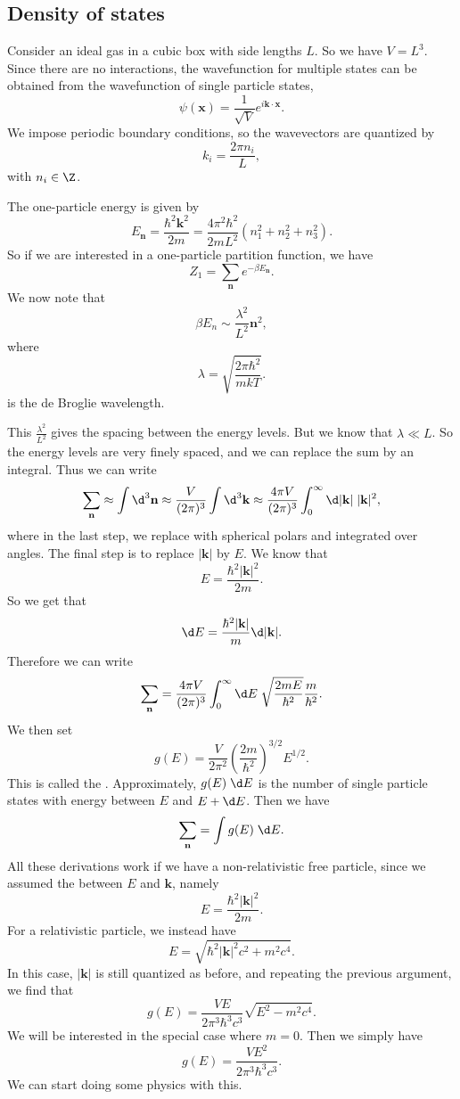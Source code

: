 \documentclass[a4paper]{article}
\begin{document}
\subsection{Density of states}
Consider an ideal gas in a cubic box with side lengths $L$. So we have $V = L^3$. Since there are no interactions, the wavefunction for multiple states can be obtained from the wavefunction of single particle states,
\[
  \psi(\mathbf{x}) = \frac{1}{\sqrt{V}} e^{i\mathbf{k}\cdot \mathbf{x}}.
\]
We impose periodic boundary conditions, so the wavevectors are quantized by
\[
  k_i = \frac{2\pi n_i}{L},
\]
with $n_i \in \Z$.

The one-particle energy is given by
\[
  E_\mathbf{n} = \frac{\hbar^2 \mathbf{k}^2}{2m} = \frac{4\pi^2 \hbar^2}{2mL^2}(n_1^2 + n_2^2 + n_3^2).
\]
So if we are interested in a one-particle partition function, we have
\[
  Z_1 = \sum_\mathbf{n} e^{-\beta E_\mathbf{n}}.
\]
We now note that
\[
  \beta E_n \sim \frac{\lambda^2}{L^2}\mathbf{n}^2,
\]
where
\[
  \lambda = \sqrt{\frac{2\pi \hbar^2}{mkT}}.
\]
is the de Broglie wavelength.

This $\frac{\lambda^2}{L^2}$ gives the spacing between the energy levels. But we know that $\lambda \ll L$. So the energy levels are very finely spaced, and we can replace the sum by an integral. Thus we can write
\[
  \sum_\mathbf{n} \approx \int \d^3 \mathbf{n} \approx \frac{V}{(2\pi)^3} \int \d^3 \mathbf{k} \approx \frac{4\pi V}{(2\pi)^3} \int_0^\infty \d |\mathbf{k}|\; |\mathbf{k}|^2,
\]
where in the last step, we replace with spherical polars and integrated over angles. The final step is to replace $|\mathbf{k}|$ by $E$. We know that
\[
  E = \frac{\hbar^2 |\mathbf{k}|^2}{2m}.
\]
So we get that
\[
  \d E = \frac{\hbar^2 |\mathbf{k}|}{m} \d |\mathbf{k}|.
\]
Therefore we can write
\[
  \sum_\mathbf{n} = \frac{4\pi V}{(2\pi)^3} \int_0^\infty \d E\; \sqrt{\frac{2mE}{\hbar^2}}\frac{m}{\hbar^2}.
\]
We then set
\[
  g(E) = \frac{V}{2\pi^2} \left(\frac{2m}{\hbar^2}\right)^{3/2} E^{1/2}.
\]
This is called the . Approximately, $g(E) \;\d E$ is the number of single particle states with energy between $E$ and $E + \d E$. Then we have
\[
  \sum_\mathbf{n} = \int g(E)\;\d E.
\]
All these derivations work if we have a non-relativistic free particle, since we assumed the  between $E$ and $\mathbf{k}$, namely
\[
  E = \frac{\hbar^2 |\mathbf{k}|^2}{2m}.
\]
For a relativistic particle, we instead have
\[
  E = \sqrt{\hbar^2 |\mathbf{k}|^2 c^2 + m^2c^4}.
\]
In this case, $|\mathbf{k}|$ is still quantized as before, and repeating the previous argument, we find that
\[
  g(E) = \frac{VE}{2\pi^3 \hbar^3 c^3} \sqrt{E^2 - m^2 c^4}.
\]
We will be interested in the special case where $m = 0$. Then we simply have
\[
  g(E) = \frac{VE^2}{2\pi^3 \hbar^3 c^3}.
\]
We can start doing some physics with this.
\end{document}
